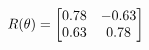 \documentclass[preview]{standalone}
\begin{document}
\begin{align*}
\special{dvisvgm:raw <g id='unique000'>}R(\theta) = \begin{bmatrix}0.78 & -0.63\\0.63 & 0.78\end{bmatrix}\special{dvisvgm:raw </g>}
\end{align*}
\end{document}
